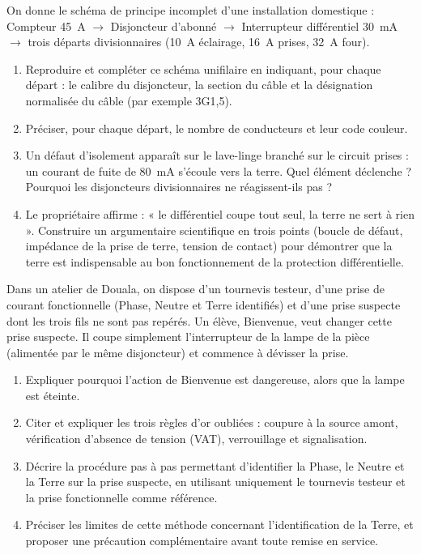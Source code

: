 \documentclass[11pt]{article}
\begin{document}
\begin{exercice}
On donne le schéma de principe incomplet d'une installation domestique : Compteur \SI{45}{A} $\rightarrow$ Disjoncteur d'abonné $\rightarrow$ Interrupteur différentiel \SI{30}{mA} $\rightarrow$ trois départs divisionnaires (\SI{10}{A} éclairage, \SI{16}{A} prises, \SI{32}{A} four).
\begin{enumerate}
\item Reproduire et compléter ce schéma unifilaire en indiquant, pour chaque départ : le calibre du disjoncteur, la section du câble et la désignation normalisée du câble (par exemple 3G1,5).
\item Préciser, pour chaque départ, le nombre de conducteurs et leur code couleur.
\item Un défaut d'isolement apparaît sur le lave-linge branché sur le circuit prises : un courant de fuite de \SI{80}{mA} s'écoule vers la terre. Quel élément déclenche ? Pourquoi les disjoncteurs divisionnaires ne réagissent-ils pas ?
\item Le propriétaire affirme : « le différentiel coupe tout seul, la terre ne sert à rien ». Construire un argumentaire scientifique en trois points (boucle de défaut, impédance de la prise de terre, tension de contact) pour démontrer que la terre est indispensable au bon fonctionnement de la protection différentielle.
\end{enumerate}
\end{exercice}

\begin{exercice}
Dans un atelier de Douala, on dispose d'un tournevis testeur, d'une prise de courant fonctionnelle (Phase, Neutre et Terre identifiés) et d'une prise suspecte dont les trois fils ne sont pas repérés. Un élève, Bienvenue, veut changer cette prise suspecte. Il coupe simplement l'interrupteur de la lampe de la pièce (alimentée par le même disjoncteur) et commence à dévisser la prise.
\begin{enumerate}
\item Expliquer pourquoi l'action de Bienvenue est dangereuse, alors que la lampe est éteinte.
\item Citer et expliquer les trois règles d'or oubliées : coupure à la source amont, vérification d'absence de tension (VAT), verrouillage et signalisation.
\item Décrire la procédure pas à pas permettant d'identifier la Phase, le Neutre et la Terre sur la prise suspecte, en utilisant uniquement le tournevis testeur et la prise fonctionnelle comme référence.
\item Préciser les limites de cette méthode concernant l'identification de la Terre, et proposer une précaution complémentaire avant toute remise en service.
\end{enumerate}
\end{exercice}
\end{document}
